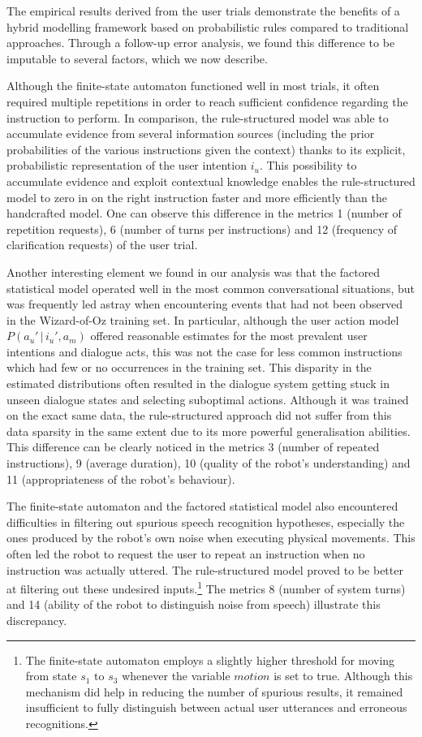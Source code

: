The empirical results derived from the user trials demonstrate the benefits of a hybrid modelling framework based on probabilistic rules compared to traditional approaches. Through a follow-up error analysis, we found this difference to be imputable to several factors, which we now describe.

Although the finite-state automaton functioned well in most trials, it often required multiple repetitions in order to reach sufficient confidence regarding the instruction to perform.  In comparison, the rule-structured model was able to accumulate evidence from several information sources (including the prior probabilities of the various instructions given the context) thanks to its explicit, probabilistic representation of the user intention $i_u$.  This possibility to accumulate evidence and exploit contextual knowledge enables the rule-structured model to zero in on the right instruction faster and more efficiently than the handcrafted model. One can observe this difference in the metrics 1 (number of repetition requests), 6 (number of turns per instructions) and 12 (frequency of clarification requests) of the user trial.  

Another interesting element we found in our analysis was that the factored statistical model operated well in the most common conversational situations, but was frequently led astray when encountering events that had not been observed in the Wizard-of-Oz training set. In particular, although the user action model $P(a_u'\, | \, i_u', a_m)$ offered reasonable estimates for the most prevalent user intentions and dialogue acts, this was not the case for less common instructions which had few or no occurrences in the training set.  This disparity in the estimated distributions often resulted in the dialogue system getting stuck in unseen dialogue states and selecting suboptimal actions.  Although it was trained on the exact same data, the rule-structured approach did not suffer from this data sparsity in the same extent due to its more powerful generalisation abilities. This difference can be clearly noticed in the metrics 3 (number of repeated instructions), 9 (average duration), 10 (quality of the robot's understanding) and 11 (appropriateness of the robot's behaviour). 

The finite-state automaton and the factored statistical model also encountered difficulties in filtering out spurious speech recognition hypotheses, especially the ones produced by the robot's own noise when executing physical movements.  This often led the robot to request the user to repeat an instruction when no instruction was actually uttered.  The rule-structured model proved to be better at filtering out these undesired inputs.\footnote{The finite-state automaton employs a slightly higher threshold for moving from state $s_1$ to $s_3$ whenever the variable $\mathit{motion}$ is set to true. Although this mechanism did help in reducing the number of spurious results, it remained insufficient to fully distinguish between actual user utterances and erroneous recognitions.}  The metrics 8 (number of system turns) and 14 (ability of the robot to distinguish noise from speech) illustrate this discrepancy. 

